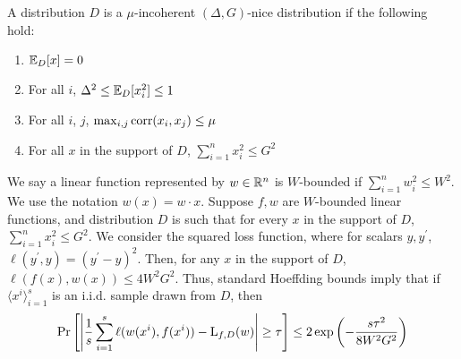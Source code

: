\begin{definition}
\label{defn:bhutan} A distribution $D$ is a $\mu$-incoherent $(\Delta, G)$-nice
distribution if the following hold:
\begin{enumerate}
\item $\mathbb{E}_D[x] = 0$
\item For all $i$, $\Delta^2 \leq \mathbb{E}_D[x_i^2] \leq 1$
\item For all $i$, $j$, $\max_{i, j} \mathrm{corr}(x_i, x_j) \leq \mu$
\item For all $x$ in the support of $D$, $\sum_{i=1}^n x_i^2 \leq G^2$
\end{enumerate}
\end{definition}


We say a linear function represented by $w \in \mathbb{R}^n$ is $W$-bounded if
$\sum_{i=1}^n w_i^2 \leq W^2$. We use the notation $w(x) = w \cdot x$. Suppose
$f, w$ are $W$-bounded linear functions, and distribution $D$ is such that for every
$x$ in the support of $D$, $\sum_{i=1}^n x_i^2 \leq G^2$.  We consider the
squared loss function, where for scalars $y, y^\prime$, $\ell(y^\prime, y) =
(y^\prime - y)^2$.  Then, for any $x$ in the support of $D$, $\ell(f(x), w(x))
\leq 4 W^2G^2$. Thus, standard Hoeffding bounds imply that
if $\langle x^i \rangle_{i=1}^s$ is an i.i.d. sample drawn from $D$, then
\[ 
\Pr\left[\left| \frac{1}{s} \sum_{i=1}^s \ell(w(x^i), f(x^i)) - \mathrm{L}_{f, D}(w)
\right| \geq \tau \right] \leq 2 \exp\left( -\frac{ s \tau^2}{8W^2G^2}\right)
\]


